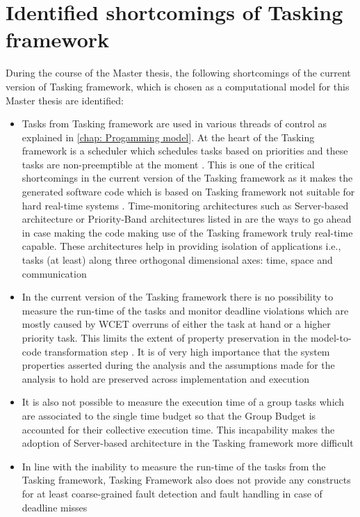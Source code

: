 \section{Identified shortcomings of Tasking framework}
During the course of the Master thesis, the following shortcomings of the current version of Tasking framework, which is chosen as a computational model for this Master thesis are identified:
\begin{itemize}
\item Tasks from Tasking framework are used in various threads of control as explained in \cref{chap: Progamming model}. At the heart of the Tasking framework is a scheduler which schedules tasks based on priorities and these tasks are non-preemptible at the moment \cite{TaskFr}. This is one of the critical shortcomings in the current version of the Tasking framework as it makes the generated software code which is based on Tasking framework not suitable for hard real-time systems \cite{TempIsolation}. Time-monitoring architectures such as Server-based architecture or Priority-Band architectures listed in \cite{TempIsolation} are the ways to go ahead in case making the code making use of the Tasking framework truly real-time capable. These architectures help in providing isolation of applications i.e., tasks (at least) along three orthogonal dimensional axes: time, space and communication
\item In the current version of the Tasking framework there is no possibility to measure the run-time of the tasks and monitor deadline violations which are mostly caused by WCET overruns of either the task at hand or a higher priority task. This limits the extent of property preservation in the model-to-code transformation step \cite{TempIsolation}. It is of very high importance that the system properties asserted during the analysis and the assumptions made for the analysis to hold are preserved across implementation and execution \cite{EvoRAVCodeAr}\cite{TempIsolation}
\item It is also not possible to measure the execution time of a group tasks which are associated to the single time budget so that the Group Budget is accounted for their collective execution time. This incapability makes the adoption of Server-based architecture in the Tasking framework more difficult
\item In line with the inability to measure the run-time of the tasks from the Tasking framework, Tasking Framework also does not provide any constructs for at least coarse-grained fault detection and fault handling in case of deadline misses 
\end{itemize}

